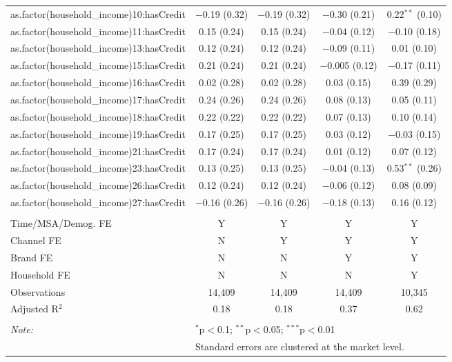 \begin{table}[!htbp]
\begin{tabular}{@{\extracolsep{5pt}}lcccc}
  as.factor(household\_income)10:hasCredit & $-$0.19 (0.32) & $-$0.19 (0.32) & $-$0.30 (0.21) & 0.22$^{**}$ (0.10) \\ 
  as.factor(household\_income)11:hasCredit & 0.15 (0.24) & 0.15 (0.24) & $-$0.04 (0.12) & $-$0.10 (0.18) \\ 
  as.factor(household\_income)13:hasCredit & 0.12 (0.24) & 0.12 (0.24) & $-$0.09 (0.11) & 0.01 (0.10) \\ 
  as.factor(household\_income)15:hasCredit & 0.21 (0.24) & 0.21 (0.24) & $-$0.005 (0.12) & $-$0.17 (0.11) \\ 
  as.factor(household\_income)16:hasCredit & 0.02 (0.28) & 0.02 (0.28) & 0.03 (0.15) & 0.39 (0.29) \\ 
  as.factor(household\_income)17:hasCredit & 0.24 (0.26) & 0.24 (0.26) & 0.08 (0.13) & 0.05 (0.11) \\ 
  as.factor(household\_income)18:hasCredit & 0.22 (0.22) & 0.22 (0.22) & 0.07 (0.13) & 0.10 (0.14) \\ 
  as.factor(household\_income)19:hasCredit & 0.17 (0.25) & 0.17 (0.25) & 0.03 (0.12) & $-$0.03 (0.15) \\ 
  as.factor(household\_income)21:hasCredit & 0.17 (0.24) & 0.17 (0.24) & 0.01 (0.12) & 0.07 (0.12) \\ 
  as.factor(household\_income)23:hasCredit & 0.13 (0.25) & 0.13 (0.25) & $-$0.04 (0.13) & 0.53$^{**}$ (0.26) \\ 
  as.factor(household\_income)26:hasCredit & 0.12 (0.24) & 0.12 (0.24) & $-$0.06 (0.12) & 0.08 (0.09) \\ 
  as.factor(household\_income)27:hasCredit & $-$0.16 (0.26) & $-$0.16 (0.26) & $-$0.18 (0.13) & 0.16 (0.12) \\ 
 \hline \\[-1.8ex] 
Time/MSA/Demog. FE & Y & Y & Y & Y \\ 
Channel FE & N & Y & Y & Y \\ 
Brand FE & N & N & Y & Y \\ 
Household FE & N & N & N & Y \\ 
Observations & 14,409 & 14,409 & 14,409 & 10,345 \\ 
Adjusted R$^{2}$ & 0.18 & 0.18 & 0.37 & 0.62 \\ 
\hline 
\hline \\[-1.8ex] 
\textit{Note:}  & \multicolumn{4}{l}{$^{*}$p$<$0.1; $^{**}$p$<$0.05; $^{***}$p$<$0.01} \\ 
 & \multicolumn{4}{l}{Standard errors are clustered at the market level.} \\ 
\end{tabular} 
\end{table} 
